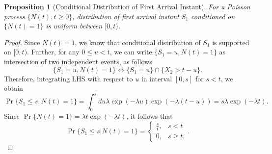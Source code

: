 \documentclass[a4paper,10pt]{article}
\theoremstyle{plain}
\newtheorem{prop}[thm]{Proposition}
\theoremstyle{definition}
\begin{document}
\begin{prop}[Conditional Distribution of First Arrival Instant] For a Poisson process $\{N(t), t\geqslant 0\}$, distribution of first arrival instant $S_1$ conditioned on $\{N(t)=1\}$ is uniform between $[0,t)$.
\end{prop}
\begin{proof} Since $N(t) = 1$, we know that conditional distribution of $S_1$ is supported on $[0,t)$. Further, for any $0 \leq u < t$, we can write $\{S_1 = u, N(t) = 1\}$ as intersection of two independent events, as follows
\begin{equation*}
\{S_1 = u, N(t) = 1\} \iff \{S_1 = u\}\cap\{X_2 > t - u\}.
\end{equation*}
Therefore, integrating LHS with respect to $u$ in interval $[0,s]$ for $s < t$, we obtain
\begin{equation*}
\Pr\{S_1 \leq s, N(t) = 1\} = \int_{0}^{s}du \lambda \exp(-\lambda u)\exp(-\lambda (t-u)) = s\lambda\exp(-\lambda t).
\end{equation*}
Since $\Pr\{N(t) = 1\} = \lambda t \exp(-\lambda t)$, it follows that 
\begin{equation*}
\Pr\{S_1 \leq s| N(t) = 1\} = \begin{cases}\frac{s}{t}, & s < t\\ 0, & s \geq t.\end{cases}.
\end{equation*}
\end{proof}
\end{document}
